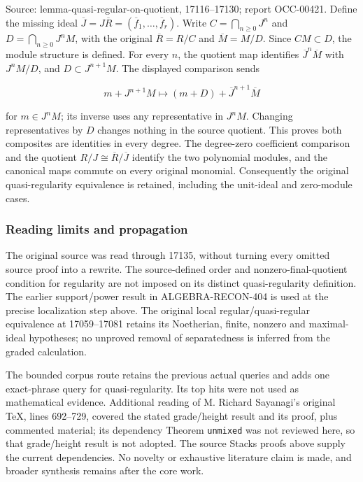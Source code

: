 Source: lemma-quasi-regular-on-quotient, 17116--17130; report OCC-00421. Define the missing ideal \(\overline J=J\overline R=(\overline f_1,\ldots,\overline f_r)\). Write \(C=\bigcap_{n\geq0}J^n\) and \(D=\bigcap_{n\geq0}J^nM\), with the original \(\overline R=R/C\) and \(\overline M=M/D\). Since \(CM\subset D\), the module structure is defined. For every \(n\), the quotient map identifies \(\overline J^n\overline M\) with \(J^nM/D\), and \(D\subset J^{n+1}M\). The displayed comparison sends

\[
m+J^{n+1}M\longmapsto (m+D)+\overline J^{n+1}\overline M
\]

for \(m\in J^nM\); its inverse uses any representative in \(J^nM\). Changing representatives by \(D\) changes nothing in the source quotient. This proves both composites are identities in every degree. The degree-zero coefficient comparison and the quotient \(R/J\cong\overline R/\overline J\) identify the two polynomial modules, and the canonical maps commute on every original monomial. Consequently the original quasi-regularity equivalence is retained, including the unit-ideal and zero-module cases.

\subsubsection{Reading limits and propagation}\label{reading-limits-and-propagation}

The original source was read through 17135, without turning every omitted source proof into a rewrite. The source-defined order and nonzero-final-quotient condition for regularity are not imposed on its distinct quasi-regularity definition. The earlier support/power result in ALGEBRA-RECON-404 is used at the precise localization step above. The original local regular/quasi-regular equivalence at 17059--17081 retains its Noetherian, finite, nonzero and maximal-ideal hypotheses; no unproved removal of separatedness is inferred from the graded calculation.

The bounded corpus route retains the previous actual queries and adds one exact-phrase query for quasi-regularity. Its top hits were not used as mathematical evidence. Additional reading of M. Richard Sayanagi's original TeX, lines 692--729, covered the stated grade/height result and its proof, plus commented material; its dependency Theorem \texttt{unmixed} was not reviewed here, so that grade/height result is not adopted. The source Stacks proofs above supply the current dependencies. No novelty or exhaustive literature claim is made, and broader synthesis remains after the core work.
